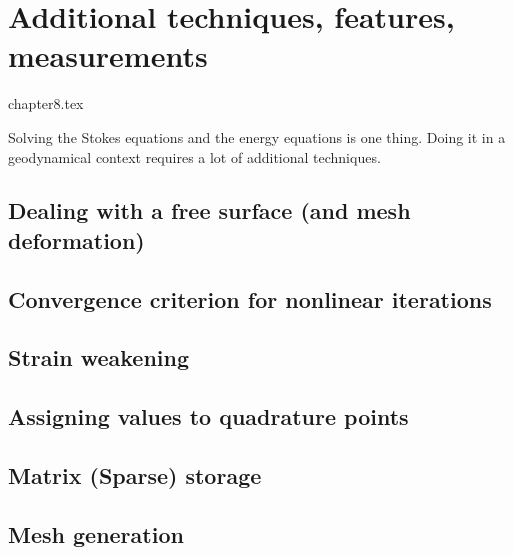 \chapter{Additional techniques, features, measurements} %

\begin{flushright} {\tiny {\color{gray} chapter8.tex}} \end{flushright}

Solving the Stokes equations and the energy equations is one thing. Doing it in 
a geodynamical context requires a lot of additional techniques. 
\newpage %
\section{Dealing with a free surface (and mesh deformation)}\label{sec:freesurface}  
\newpage %
\section{Convergence criterion for nonlinear iterations\label{sec:nlconvcrit}} 
\newpage %
\section{Strain weakening} \label{sec:strainweakening}  %
\newpage %
\section{Assigning values to quadrature points \label{ss:averagings}}  %
\newpage %
\section{Matrix (Sparse) storage}\label{sec:sparse_storage}  %
\newpage %
\section{Mesh generation} \label{sec:meshes}  %
\newpage %
